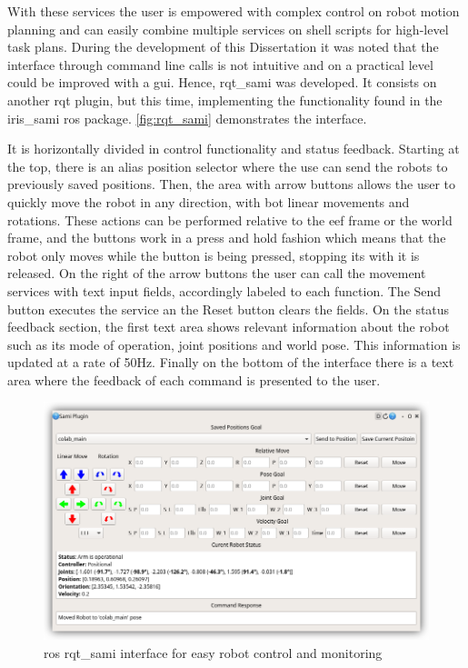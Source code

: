 \par With these services the user is empowered with complex control on robot motion planning and can easily combine multiple services on shell scripts for high-level task plans. During the development of this Dissertation it was noted that the interface through command line calls is not intuitive and on a practical level could be improved with a \ac{gui}. Hence, rqt\_sami was developed. It consists on another rqt plugin, but this time, implementing the functionality found in the iris\_sami \ac{ros} package. \autoref{fig:rqt_sami} demonstrates the interface. 
\par It is horizontally divided in control functionality and status feedback. Starting at the top, there is an alias position selector where the use can send the robots to previously saved positions. Then, the area with arrow buttons allows the user to quickly move the robot in any direction, with bot linear movements and rotations. These actions can be performed relative to the \ac{eef} frame or the world frame, and the buttons work in a press and hold fashion which means that the robot only moves while the button is being pressed, stopping its with it is released. On the right of the arrow buttons the user can call the movement services with text input fields, accordingly labeled to each function. The Send button executes the service an the Reset button clears the fields. On the status feedback section, the first text area shows relevant information about the robot such as its mode of operation, joint positions and world pose. This information is updated at a rate of 50Hz. Finally on the bottom of the interface there is a text area where the feedback of each command is presented to the user.

\begin{figure}[h]
    \centering
    \includegraphics[width=0.9\linewidth]{figs/chp5/rqt_sami.png}
    \caption{\ac{ros} rqt\_sami interface for easy robot control and monitoring}
    \label{fig:rqt_sami}
\end{figure}

